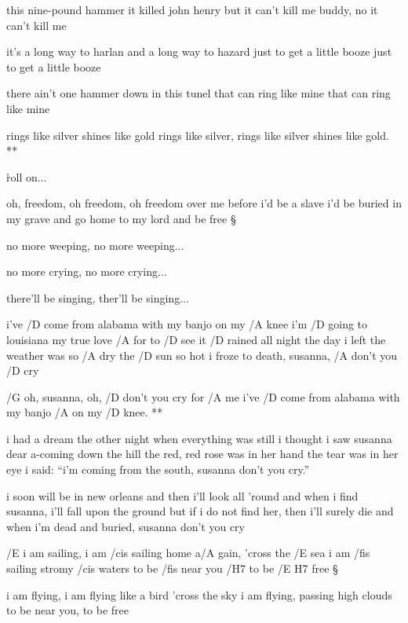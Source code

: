 this nine-pound hammer
it killed john henry
but it can't kill me
buddy, no it can't kill me \s

it's a long way to harlan
and a long way to hazard
just to get a little booze
just to get a little booze \s

there ain't one hammer
down in this tunel
that can ring like mine
that can ring like mine

\R  rings like silver
shines like gold
rings like silver, rings like silver
shines like gold. **

\r  roll on...




oh, freedom, oh freedom, oh freedom over me
before i'd be a slave i'd be buried in my grave
and go home to my lord and be free \S

no more weeping, no more weeping... \s

no more crying, no more crying... \s

there'll be singing, ther'll be singing...




i've /D come from alabama with my banjo on my /A knee
i'm /D going to louisiana my true love /A for to /D see
it /D rained all night the day i left the weather was so /A dry
the /D sun so hot i froze to death, susanna, /A don't you /D cry

\R  /G oh, susanna, oh, /D don't you cry for /A me
    i've /D come from alabama with my banjo /A on my /D knee. **

i had a dream the other night when everything was still
i thought i saw susanna dear a-coming down the hill
the red, red rose was in her hand the tear was in her eye
i said: ``i'm coming from the south, susanna don't you cry.'' \s

i soon will be in new orleans and then i'll look all 'round
and when i find susanna, i'll fall upon the ground
but if i do not find her, then i'll surely die
and when i'm dead and buried, susanna don't you cry




/E i am sailing, i am /cis sailing
home a/A gain, 'cross the /E sea 
i am /fis sailing stromy /cis waters
to be /fis near you /H7 to be /{E H7} free \S

i am flying, i am flying
like a bird 'cross the sky
i am flying, passing high clouds
to be near you, to be free \s

